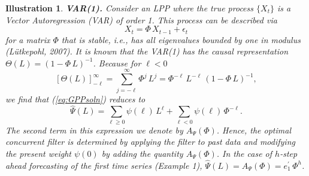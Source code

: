 \documentclass[a4paper]{book}
\newtheorem{Illustration}{Illustration}
\begin{document}
\begin{Illustration} {\bf  VAR(1).} \rm
\label{ill:var1}
 Consider an LPP where the true process $\{ X_t \}$
 is a Vector Autoregression (VAR) of order 1.  This process can be described via
\begin{equation}
\label{eq:var1-def}
  X_t = \Phi \, X_{t-1} + \epsilon_t
\end{equation}
 for a matrix $\Phi$ that is stable, i.e., has 
 all eigenvalues bounded by one in modulus (L\"utkepohl, 2007). 
It is known that the VAR(1) has the causal representation  
 $\Theta (L) = {(1 - \Phi \, L )}^{-1}$.  Because
 for $\ell < 0$ 
\[
   { [ \Theta (L) ]}_{-\ell}^{ \infty  } = \sum_{j = -\ell}^{\infty} \Phi^j \, L^j 
  = \Phi^{-\ell} \, L^{-\ell} \, {( 1 - \Phi \, L )}^{-1},
\]
 we find that (\ref{eq:GPPsoln}) reduces to
\[
  \widehat{\Psi} (L) =   \sum_{\ell \geq 0 } \psi (\ell) \, L^{\ell} +
	\sum_{\ell < 0} \psi (\ell) \, \Phi^{-\ell}.
\]
  The second term in this expression we denote by $A_{\Psi} (\Phi)$.  Hence, the optimal
 concurrent filter is determined by applying the filter to past data and modifying the
 present weight $\psi (0)$ by adding the quantity $A_{\Psi} (\Phi)$.  In the case of
 $h$-step ahead forecasting of the first time series (Example 1), $\widehat{\Psi} (L)
 = A_{\Psi} (\Phi) = e_1^{\prime} \, \Phi^h$.  
 

\end{Illustration}
\end{document}
